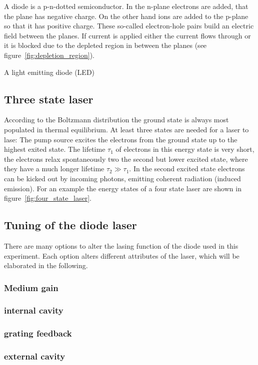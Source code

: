 A diode is a p-n-dotted semiconductor.
In the n-plane electrons are added, that the plane has negative charge.
On the other hand ions are added to the p-plane so that it has positive charge.
These so-called electron-hole pairs build an electric field between the planes.
If current is applied either the current flows through or it is blocked due to the depleted region
in between the planes (see figure~\ref{fig:depletion_region}).

A light emitting diode (LED) %

\subsection{Three state laser}\label{three-state-laser}

According to the Boltzmann distribution the ground state is always most populated in thermal
equilibrium.
At least three states are needed for a laser to lase: The pump source excites the electrons from
the ground state up to the highest exited state.
The lifetime \(\tau_1\) of electrons in this energy state is very short, the electrons relax
spontaneously two the second but lower excited state, where they have a much longer lifetime
\(\tau_2 \gg \tau_1\).
In the second excited state electrons can be kicked out by incoming photons, emitting coherent
radiation (induced emission).
For an example the energy states of a four state laser are shown in
figure~\ref{fig:four_state_laser}.

\subsection{Tuning of the diode laser}\label{tuning-of-the-diode-laser}

There are many options to alter the lasing function of the diode used in this experiment.
Each option alters different attributes of the laser, which will be elaborated in the following.

\subsubsection{Medium gain}\label{medium-gain}

\subsubsection{internal cavity}\label{internal-cavity}

\subsubsection{grating feedback}\label{grating-feedback}

\subsubsection{external cavity}\label{external-cavity}
